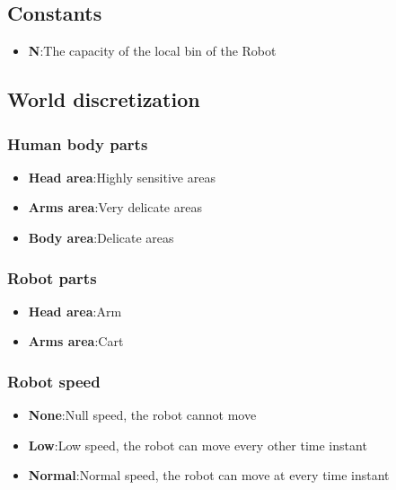\documentclass[a4paper]{article}
\begin{document}
\subsection{Constants}
\begin{itemize}
    \item \textbf{N}:\@ The capacity of the local bin of the Robot
\end{itemize}
\subsection{World discretization}

\subsubsection{Human body parts}
\begin{itemize}
    \item \textbf{Head area}:\@ Highly sensitive areas
    \item \textbf{Arms area}:\@ Very delicate areas
    \item \textbf{Body area}:\@ Delicate areas
\end{itemize}

\subsubsection{Robot parts}
\begin{itemize}
    \item \textbf{Head area}:\@ Arm
    \item \textbf{Arms area}:\@ Cart
\end{itemize}

\subsubsection{Robot speed}
\begin{itemize}
    \item \textbf{None}:\@ Null speed, the robot cannot move
    \item \textbf{Low}:\@ Low speed, the robot can move every other time instant
    \item \textbf{Normal}:\@ Normal speed, the robot can move at every time instant
\end{itemize}

\end{document}
